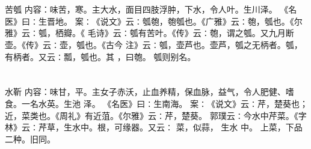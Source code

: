 \documentclass[12pt,UTF8]{ctexbook}
\begin{document}
\chapter{}苦瓠
内容：味苦，寒。主大水，面目四肢浮肿，下水，令人叶。生川泽。 
《名医》曰∶生晋地。 
案∶《说文》云∶瓠匏，匏瓠也。《广雅》云∶匏，瓠也。《尔雅》云∶瓠，栖瓣。《 
毛诗》云∶瓠有苦叶。《传》云∶匏，谓之瓠。又九月断壶。《传》云∶壶，瓠也。《古今 
注》云∶瓠，壶芦也。壶芦，瓠之无柄者。瓠，有柄者。又云∶瓢，瓠也。其 ，曰匏。 
瓠则别名。 


\chapter{}水靳
内容：味甘，平。主女子赤沃，止血养精，保血脉，益气，令人肥健、嗜食。一名水英。生池 
泽。 
《名医》曰∶生南海。 
案∶《说文》云∶芹，楚葵也；近，菜类也。《周礼》有近菹。《尔雅》云∶芹，楚葵。 
郭璞云∶今水中芹菜。《字林》云∶芹草，生水中。根，可缘器。又云∶ 菜，似蒜， 
生水 
中。 
上菜，下品二种。旧同。 
\end{document}
